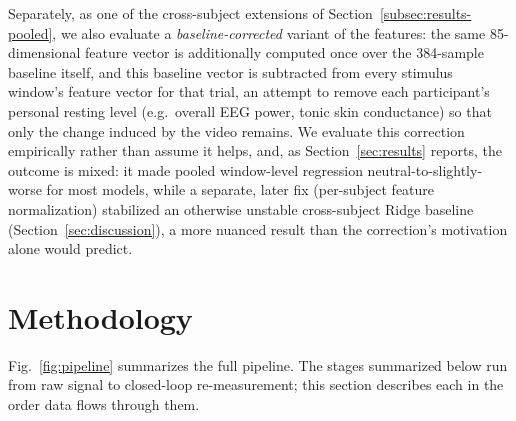 \documentclass[conference]{IEEEtran}
\begin{document}
Separately, as one of the cross-subject extensions of
Section~\ref{subsec:results-pooled}, we also evaluate a
\emph{baseline-corrected} variant of the features: the same
85-dimensional feature vector is additionally computed once over the
384-sample baseline itself, and this baseline vector is subtracted from
every stimulus window's feature vector for that trial, an attempt to
remove each participant's personal resting level (e.g.\ overall EEG power,
tonic skin conductance) so that only the change induced by the video
remains. We evaluate this correction empirically rather than assume it
helps, and, as Section~\ref{sec:results} reports, the outcome is mixed:
it made pooled window-level regression neutral-to-slightly-worse for most
models, while a separate, later fix (per-subject feature normalization)
stabilized an otherwise unstable cross-subject Ridge baseline
(Section~\ref{sec:discussion}), a more nuanced result than the
correction's motivation alone would predict.

\section{Methodology}
\label{sec:methodology}

Fig.~\ref{fig:pipeline} summarizes the full pipeline. The stages
summarized below run from raw signal to closed-loop re-measurement; this
section describes each in the order data flows through them.
\end{document}
